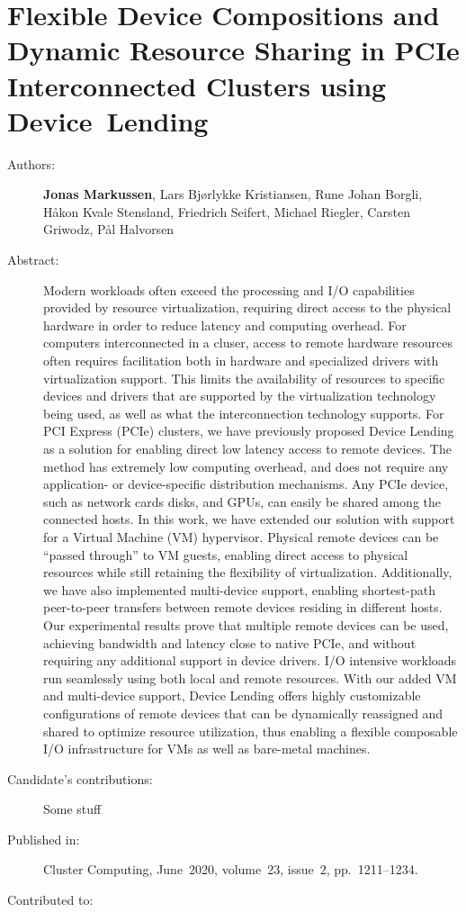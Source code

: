 \chapter{Flexible Device Compositions and Dynamic Resource Sharing in PCIe Interconnected Clusters using Device~Lending}
\label{paper:CC-2019}
\paperthumb

\begin{description}
	\item[Authors:]
		\textbf{Jonas Markussen}, Lars Bj{\o}rlykke Kristiansen, Rune Johan Borgli, H{\aa}kon Kvale Stensland,
		Friedrich Seifert, Michael Riegler, Carsten Griwodz, P{\aa}l Halvorsen

	\item[Abstract:]
		Modern workloads often exceed the processing and I/O capabilities provided by resource virtualization,
		requiring direct access to the physical hardware in order to reduce latency and computing overhead.
		For computers interconnected in a cluser, access to remote hardware resources often requires facilitation
		both in hardware and specialized drivers with virtualization support. This limits the availability of
		resources to specific devices and drivers that are supported by the virtualization technology being used, as
		well as what the interconnection technology supports.
		For PCI Express (PCIe) clusters, we have previously proposed Device Lending as a solution for enabling direct
		low latency access to remote devices.
		The method has extremely low computing overhead, and does not
		require any application- or device-specific distribution mechanisms. Any PCIe device, such as network cards disks, and
		GPUs, can easily be shared among the connected hosts.
		In this work, we have extended our solution with support for a Virtual Machine (VM) hypervisor.
		Physical remote devices can be  ``passed through'' to VM guests, enabling direct access to physical resources 
		while still retaining the flexibility of virtualization. Additionally, we have also implemented multi-device
		support, enabling shortest-path peer-to-peer transfers between remote devices residing in different hosts.
		Our experimental results prove that multiple remote devices can be used, achieving bandwidth and latency
		close to native PCIe, and without requiring any additional support in device drivers. 
		I/O intensive workloads run seamlessly using both local and remote resources.
		With our added VM and multi-device support, Device Lending offers highly customizable 
		configurations of remote devices that can be dynamically reassigned and shared to optimize resource 
		utilization, thus enabling a flexible composable I/O infrastructure for VMs as well as bare-metal
		machines.

	\item[Candidate's contributions:]
		Some stuff

	\item[Published in:]
		Cluster Computing,
		June~2020, volume~23, issue~2, pp.~1211--1234.

	\item[Contributed to:]

\end{description}
